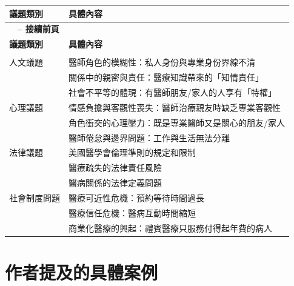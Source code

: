 \documentclass[12pt,a4paper]{article}
\begin{document}
\begin{longtable}{>{\raggedright\arraybackslash}p{4cm} >{\raggedright\arraybackslash}p{11cm}}
\toprule
\textbf{\textcolor{emergency_blue}{議題類別}} & \textbf{\textcolor{emergency_blue}{具體內容}} \\
\midrule
\endfirsthead

\multicolumn{2}{c}%
{{\bfseries \tablename\ \thetable{} -- 接續前頁}} \\
\toprule
\textbf{\textcolor{emergency_blue}{議題類別}} & \textbf{\textcolor{emergency_blue}{具體內容}} \\
\midrule
\endhead

\midrule \multicolumn{2}{r}{{接續下頁}} \\ \midrule
\endfoot

\bottomrule
\endlastfoot

\textcolor{emergency_red}{人文議題} & 醫師角色的模糊性：私人身份與專業身份界線不清 \\
& 關係中的親密與責任：醫療知識帶來的「知情責任」 \\
& 社會不平等的體現：有醫師朋友/家人的人享有「特權」 \\

\textcolor{emergency_red}{心理議題} & 情感負擔與客觀性喪失：醫師治療親友時缺乏專業客觀性 \\
& 角色衝突的心理壓力：既是專業醫師又是關心的朋友/家人 \\
& 醫師倦怠與邊界問題：工作與生活無法分離 \\

\textcolor{emergency_red}{法律議題} & 美國醫學會倫理準則的規定和限制 \\
& 醫療疏失的法律責任風險 \\
& 醫病關係的法律定義問題 \\

\textcolor{emergency_red}{社會制度問題} & 醫療可近性危機：預約等待時間過長 \\
& 醫療信任危機：醫病互動時間縮短 \\
& 商業化醫療的興起：禮賓醫療只服務付得起年費的病人 \\
\end{longtable}

\section{作者提及的具體案例}
\end{document}
